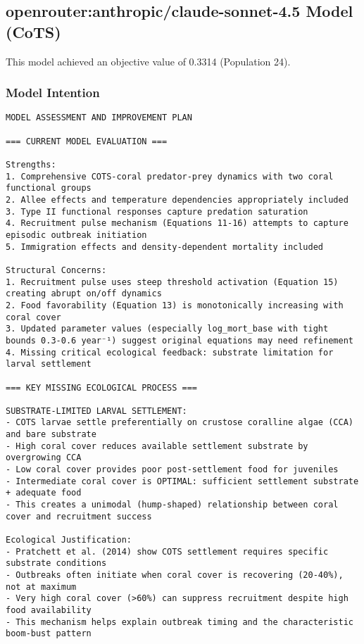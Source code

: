 \subsection{openrouter:anthropic/claude-sonnet-4.5 Model (CoTS)}
This model achieved an objective value of 0.3314 (Population 24).

\subsubsection{Model Intention}
\begin{lstlisting}
MODEL ASSESSMENT AND IMPROVEMENT PLAN

=== CURRENT MODEL EVALUATION ===

Strengths:
1. Comprehensive COTS-coral predator-prey dynamics with two coral functional groups
2. Allee effects and temperature dependencies appropriately included
3. Type II functional responses capture predation saturation
4. Recruitment pulse mechanism (Equations 11-16) attempts to capture episodic outbreak initiation
5. Immigration effects and density-dependent mortality included

Structural Concerns:
1. Recruitment pulse uses steep threshold activation (Equation 15) creating abrupt on/off dynamics
2. Food favorability (Equation 13) is monotonically increasing with coral cover
3. Updated parameter values (especially log_mort_base with tight bounds 0.3-0.6 year⁻¹) suggest original equations may need refinement
4. Missing critical ecological feedback: substrate limitation for larval settlement

=== KEY MISSING ECOLOGICAL PROCESS ===

SUBSTRATE-LIMITED LARVAL SETTLEMENT:
- COTS larvae settle preferentially on crustose coralline algae (CCA) and bare substrate
- High coral cover reduces available settlement substrate by overgrowing CCA
- Low coral cover provides poor post-settlement food for juveniles
- Intermediate coral cover is OPTIMAL: sufficient settlement substrate + adequate food
- This creates a unimodal (hump-shaped) relationship between coral cover and recruitment success

Ecological Justification:
- Pratchett et al. (2014) show COTS settlement requires specific substrate conditions
- Outbreaks often initiate when coral cover is recovering (20-40%), not at maximum
- Very high coral cover (>60%) can suppress recruitment despite high food availability
- This mechanism helps explain outbreak timing and the characteristic boom-bust pattern


\end{lstlisting}
